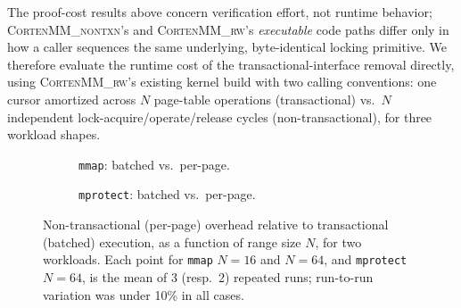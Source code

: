 \documentclass[10pt]{article}
\newcommand{\corten}[1]{\textsc{CortenMM\_#1}}
\begin{document}
The proof-cost results above concern verification effort, not runtime
behavior; \corten{nontxn}'s and \corten{rw}'s \emph{executable} code
paths differ only in how a caller sequences the same underlying,
byte-identical locking primitive. We therefore evaluate the runtime
cost of the transactional-interface removal directly, using
\corten{rw}'s existing kernel build with two calling conventions: one
cursor amortized across $N$ page-table operations (transactional) vs.\
$N$ independent lock-acquire/operate/release cycles (non-transactional),
for three workload shapes.

\begin{figure}[h]
\centering
\begin{subfigure}{0.48\textwidth}
\centering
{}
\caption{\texttt{mmap}: batched vs.\ per-page.}
\label{fig:perf-mmap}
\end{subfigure}
\hfill
\begin{subfigure}{0.48\textwidth}
\centering
{}
\caption{\texttt{mprotect}: batched vs.\ per-page.}
\label{fig:perf-mprotect}
\end{subfigure}
\caption{Non-transactional (per-page) overhead relative to
transactional (batched) execution, as a function of range size $N$, for
two workloads. Each point for \texttt{mmap} $N{=}16$ and $N{=}64$, and
\texttt{mprotect} $N{=}64$, is the mean of 3 (resp.\ 2) repeated runs;
run-to-run variation was under 10\% in all cases.}
\label{fig:perf-batch}
\end{figure}
\end{document}
